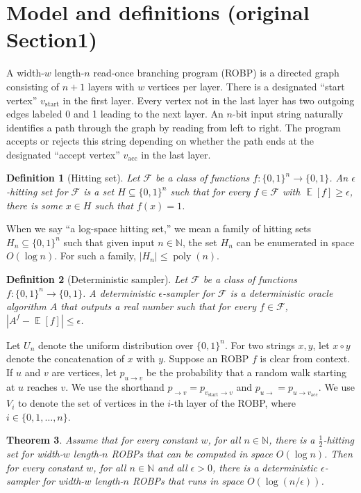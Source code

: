 \documentclass[10pt,a4paper]{article}
\newtheorem{theorem}{Theorem}[section]
\newtheorem{definition}[theorem]{Definition}
\DeclareMathOperator*{\ExpVal}{\mathbb E}
\newcommand{\N}{\mathbb N}
\begin{document}
\section*{Model and definitions (original Section1)}
A width-$w$ length-$n$ read-once branching program (ROBP) is a directed graph consisting of $n+1$ layers with $w$ vertices per layer. There is a designated ``start vertex'' $v_{\text{start}}$ in the first layer. Every vertex not in the last layer has two outgoing edges labeled 0 and 1 leading to the next layer. An $n$-bit input string naturally identifies a path through the graph by reading from left to right. The program accepts or rejects this string depending on whether the path ends at the designated ``accept vertex'' $v_{\text{acc}}$ in the last layer.
\setcounter{theorem}{1}
\begin{definition}[Hitting set]
Let $\mathcal F$ be a class of functions $f:\{0,1\}^n\to\{0,1\}$. An $\epsilon$-hitting set for $\mathcal F$ is a set $H\subseteq\{0,1\}^n$ such that for every $f\in\mathcal F$ with $\ExpVal[f]\ge\epsilon$, there is some $x\in H$ such that $f(x)=1$.
\end{definition}
When we say ``a log-space hitting set,'' we mean a family of hitting sets $H_n\subseteq\{0,1\}^n$ such that given input $n\in\N$, the set $H_n$ can be enumerated in space $O(\log n)$. For such a family, $|H_n|\le\operatorname{poly}(n)$.
\setcounter{theorem}{4}
\begin{definition}[Deterministic sampler]
Let $\mathcal F$ be a class of functions $f:\{0,1\}^n\to\{0,1\}$. A deterministic $\epsilon$-sampler for $\mathcal F$ is a deterministic oracle algorithm $A$ that outputs a real number such that for every $f\in\mathcal F$, $|A^f-\ExpVal[f]|\le\epsilon$.
\end{definition}
Let $U_n$ denote the uniform distribution over $\{0,1\}^n$. For two strings $x,y$, let $x\circ y$ denote the concatenation of $x$ with $y$. Suppose an ROBP $f$ is clear from context. If $u$ and $v$ are vertices, let $p_{u\to v}$ be the probability that a random walk starting at $u$ reaches $v$. We use the shorthand $p_{\to v}=p_{v_{\text{start}}\to v}$ and $p_{u\to}=p_{u\to v_{\text{acc}}}$. We use $V_i$ to denote the set of vertices in the $i$-th layer of the ROBP, where $i\in\{0,1,\ldots,n\}$.

\setcounter{theorem}{6}
\begin{theorem} \label{thm:const-width-main}
Assume that for every constant $w$, for all $n \in \N$, there is a $\frac{1}{2}$-hitting set for width-$w$ length-$n$ ROBPs that can be computed in space $O(\log n)$. Then for every constant $w$, for all $n \in \N$ and all $\epsilon > 0$, there is a deterministic $\epsilon$-sampler for width-$w$ length-$n$ ROBPs that runs in space $O(\log(n/\epsilon))$.
\end{theorem}
\end{document}
